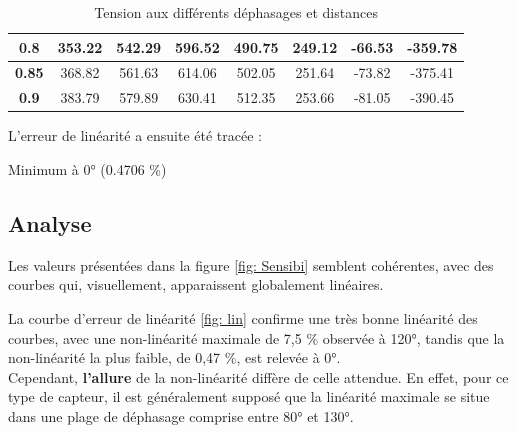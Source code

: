 \begin{table}[H]
\begin{tabular}{|c|ccccccc|}
    \textbf{0.8}               & \multicolumn{1}{c|}{353.22}     & \multicolumn{1}{c|}{542.29}      & \multicolumn{1}{c|}{596.52}      & \multicolumn{1}{c|}{490.75}      & \multicolumn{1}{c|}{249.12}       & \multicolumn{1}{c|}{-66.53}       & -359.78      \\ \hline
    \textbf{0.85}              & \multicolumn{1}{c|}{368.82}     & \multicolumn{1}{c|}{561.63}      & \multicolumn{1}{c|}{614.06}      & \multicolumn{1}{c|}{502.05}      & \multicolumn{1}{c|}{251.64}       & \multicolumn{1}{c|}{-73.82}       & -375.41      \\ \hline
    \textbf{0.9}               & \multicolumn{1}{c|}{383.79}     & \multicolumn{1}{c|}{579.89}      & \multicolumn{1}{c|}{630.41}      & \multicolumn{1}{c|}{512.35}      & \multicolumn{1}{c|}{253.66}       & \multicolumn{1}{c|}{-81.05}       & -390.45      \\ \hline
    \end{tabular}
    \caption{Tension aux différents déphasages et distances}
    \end{table}



L'erreur de linéarité a ensuite été tracée :  


    Minimum à 0° (0.4706 \%)

    \subsection{Analyse}

    Les valeurs présentées dans la figure \ref{fig: Sensibi} semblent cohérentes, avec des courbes qui, 
    visuellement, apparaissent globalement linéaires.

    La courbe d'erreur de linéarité \ref{fig: lin} confirme une très bonne linéarité des courbes, 
    avec une non-linéarité maximale de 7,5 \% observée à 120°, tandis que la non-linéarité la plus 
    faible, de 0,47 \%, est relevée à 0°. \\
    
    Cependant, \textbf{l'allure} de la non-linéarité diffère de celle attendue. En effet, pour ce type de 
    capteur, il est généralement supposé que la linéarité maximale se situe dans une plage de 
    déphasage comprise entre 80° et 130°.\\ 

